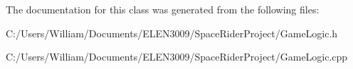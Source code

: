 The documentation for this class was generated from the following files\+:\begin{DoxyCompactItemize}
\item 
C\+:/\+Users/\+William/\+Documents/\+E\+L\+E\+N3009/\+Space\+Rider\+Project/Game\+Logic.\+h\item 
C\+:/\+Users/\+William/\+Documents/\+E\+L\+E\+N3009/\+Space\+Rider\+Project/Game\+Logic.\+cpp\end{DoxyCompactItemize}
